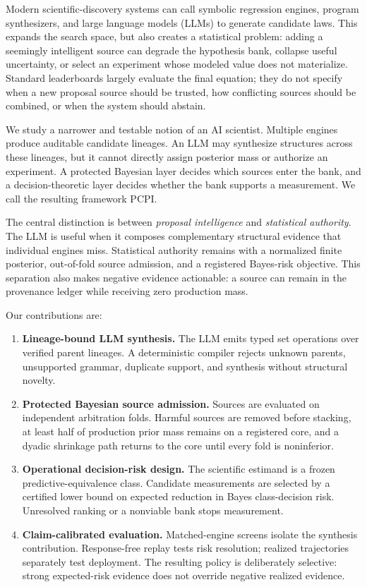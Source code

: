 \documentclass[twoside]{article}
\newcommand{\method}{PCPI}
\begin{document}
Modern scientific-discovery systems can call symbolic regression engines,
program synthesizers, and large language models (LLMs) to generate candidate
laws. This expands the search space, but also creates a statistical problem:
adding a seemingly intelligent source can degrade the hypothesis bank,
collapse useful uncertainty, or select an experiment whose modeled value does
not materialize. Standard leaderboards largely evaluate the final equation;
they do not specify when a new proposal source should be trusted, how
conflicting sources should be combined, or when the system should abstain.

We study a narrower and testable notion of an AI scientist. Multiple engines
produce auditable candidate lineages. An LLM may synthesize structures across
these lineages, but it cannot directly assign posterior mass or authorize an
experiment. A protected Bayesian layer decides which sources enter the bank,
and a decision-theoretic layer decides whether the bank supports a
measurement. We call the resulting framework \method{}.

The central distinction is between \emph{proposal intelligence} and
\emph{statistical authority}. The LLM is useful when it composes complementary
structural evidence that individual engines miss. Statistical authority
remains with a normalized finite posterior, out-of-fold source admission, and
a registered Bayes-risk objective. This separation also makes negative
evidence actionable: a source can remain in the provenance ledger while
receiving zero production mass.

Our contributions are:
\begin{enumerate}[leftmargin=*,itemsep=2pt,topsep=3pt]
  \item \textbf{Lineage-bound LLM synthesis.} The LLM emits typed set
  operations over verified parent lineages. A deterministic compiler rejects
  unknown parents, unsupported grammar, duplicate support, and synthesis
  without structural novelty.
  \item \textbf{Protected Bayesian source admission.} Sources are evaluated
  on independent arbitration folds. Harmful sources are removed before
  stacking, at least half of production prior mass remains on a registered
  core, and a dyadic shrinkage path returns to the core until every fold is
  noninferior.
  \item \textbf{Operational decision-risk design.} The scientific estimand is
  a frozen predictive-equivalence class. Candidate measurements are selected
  by a certified lower bound on expected reduction in Bayes class-decision
  risk. Unresolved ranking or a nonviable bank stops measurement.
  \item \textbf{Claim-calibrated evaluation.} Matched-engine screens isolate
  the synthesis contribution. Response-free replay tests risk resolution;
  realized trajectories separately test deployment. The resulting policy is
  deliberately selective: strong expected-risk evidence does not override
  negative realized evidence.
\end{enumerate}
\end{document}
